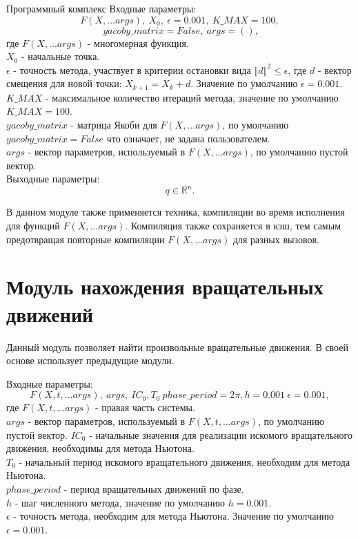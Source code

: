 \begin{chapter}{Программный комплекс}
Входные параметры: $$
F(X, ...args),  \ X_0, \ \epsilon=0.001, \ K\_MAX=100,
$$
$$
\ yacoby\_matrix=False, \ args = (),$$
где $F(X, ...args)$ - многомерная функция. \\
$X_0$ - начальные точка. \\
$\epsilon$ - точность метода, участвует в критерии остановки вида $\left\Vert d \right\Vert^2 \le \epsilon$, где $d$ - вектор смещения для новой точки: $X_{k+1} = X_k + d$. Значение по умолчанию $\epsilon = 0.001$. \\
$K\_MAX$ - максимальное количество итераций метода, значение по умолчанию $K\_MAX = 100$. \\
$yacoby\_matrix$ - матрица Якоби для $F(X, ...args)$, по умолчанию $yacoby\_matrix=False$ что означает, не задана пользователем. \\
$args$ - вектор параметров, используемый в $F(X, ...args)$, по умолчанию пустой вектор. \\
Выходные параметры: $$ q \in \mathbb{R}^n.$$

В данном модуле также применяется техника, компиляции во время исполнения 
для функций $F(X, ...args)$. Компиляция также сохраняется в кэш, тем
самым предотвращая повторные компиляции $F(X, ...args)$ для разных вызовов.


\section{Модуль нахождения вращательных движений}
Данный модуль позволяет найти произвольные вращательные движения.
В своей основе использует предыдущие модули.

Входные параметры: $$F(X, t, ...args), \ args, \ IC_0, T_0 \ phase\_period = 2\pi, h=0.001\ \epsilon=0.001,$$
где $F(X, t, ...args)$ - правая часть системы. \\
$args$ - вектор параметров, используемый в $F(X, t, ...args)$, по умолчанию пустой вектор.
$IC_0$ - начальные значения для реализации искомого вращательного движения, необходимы для метода Ньютона. \\
$T_0$ - начальный период искомого вращательного движения, необходим для метода Ньютона. \\
$phase\_period$ - период  вращательных движений по фазе. \\
$h$ - шаг численного метода, значение по умолчанию $h = 0.001$. \\
$\epsilon$ - точность метода, необходим для метода Ньютона. Значение по умолчанию $\epsilon = 0.001$.


\end{chapter}
